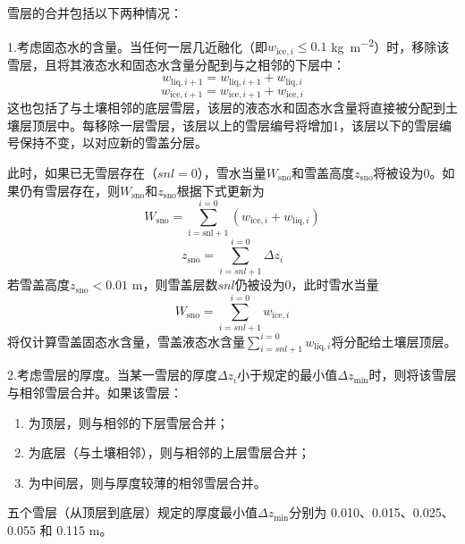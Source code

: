 雪层的合并包括以下两种情况：

1.考虑固态水的含量。当任何一层几近融化（即$w_{\mathrm{ice},i} \leqslant 0.1$ \unit{kg.m^{-2}}）时，移除该雪层，且将其液态水和固态水含量分配到与之相邻的下层中：
\begin{equation}
  w_{\mathrm{liq},i+1} = w_{\mathrm{liq},i+1} + w_{\mathrm{liq},i}
\end{equation}
\begin{equation}
  w_{\mathrm{ice},i+1} = w_{\mathrm{ice},i+1} + w_{\mathrm{ice},i}
\end{equation}
这也包括了与土壤相邻的底层雪层，该层的液态水和固态水含量将直接被分配到土壤层顶层中。每移除一层雪层，该层以上的雪层编号将增加1，该层以下的雪层编号保持不变，以对应新的雪盖分层。

此时，如果已无雪层存在（$snl=0$），雪水当量$W_{\mathrm{sno}}$和雪盖高度$z_{\mathrm{sno}}$将被设为0。如果仍有雪层存在，则$W_{\mathrm{sno}}$和$z_{\mathrm{sno}}$根据下式更新为
\begin{equation}
  W_{\mathrm{sno}} = \sum_{\mathrm{i=snl+1}}^{i=0}\left(w_{\mathrm{ice},i}+w_{\mathrm{liq},i}\right)
\end{equation}
\begin{equation}
  z_{\mathrm{sno}} = \sum_{i=snl+1}^{i=0} \Delta z_i
\end{equation}
若雪盖高度$z_{\mathrm{sno}} < 0.01$ \unit{m}，则雪盖层数$snl$仍被设为0，此时雪水当量
$$W_{\mathrm{sno}}=\sum_{i=snl+1}^{i=0} w_{\mathrm{ice},i}$$
将仅计算雪盖固态水含量，雪盖液态水含量$\sum_{i=snl+1}^{i=0} w_{\mathrm{liq},i}$将分配给土壤层顶层。

2.考虑雪层的厚度。当某一雪层的厚度$\Delta z_i$小于规定的最小值$\Delta z_{\mathrm{min}}$时，则将该雪层与相邻雪层合并。如果该雪层：
\begin{enumerate}
  \item 为顶层，则与相邻的下层雪层合并；
  \item 为底层（与土壤相邻），则与相邻的上层雪层合并；
  \item 为中间层，则与厚度较薄的相邻雪层合并。
\end{enumerate}

五个雪层（从顶层到底层）规定的厚度最小值$\Delta z_{\mathrm{min}}$分别为 0.010、0.015、0.025、0.055 和 0.115 \unit{m}。

